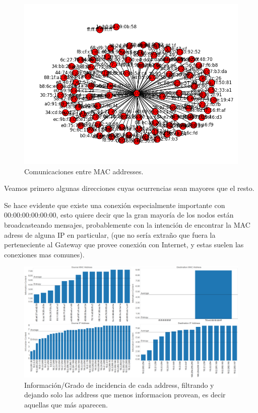 \documentclass{article}
\theoremstyle{definition}
\theoremstyle{remark}
\begin{document}

\begin{figure}[H]
\centering
\includegraphics[width=450pt]{captures/LabosDC/conn_mac.png}
\caption{Comunicaciones entre MAC addresses.}
\end{figure}

Veamos primero algunas direcciones cuyas ocurrencias sean mayores que el resto.

Se hace evidente que existe una conexión especialmente importante con 00:00:00:00:00:00, esto quiere decir que la gran mayoría de los nodos están broadcasteando mensajes, probablemente con la intención de encontrar la MAC adress de alguna IP en particular, (que no sería extraño que fuera la perteneciente al Gateway que provee conexión con Internet, y estas suelen las conexiones mas comunes).

\begin{figure}[H]
\centering
\includegraphics[width=450pt]{captures/LabosDC/PDFs Dashboard.png}
\caption{Información/Grado de incidencia de cada address, filtrando y dejando solo las address que menos informacion provean, es decir aquellas que más aparecen.}
\end{figure}
\end{document}
